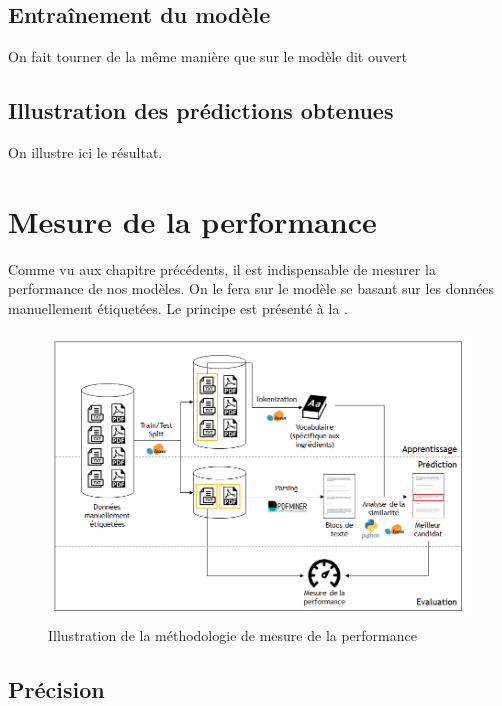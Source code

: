         \section{Entraînement du modèle}

        On fait tourner de la même manière que sur le modèle dit \og ouvert \fg

        \section{Illustration des prédictions obtenues}

        On illustre ici le résultat.

    \chapter{Mesure de la performance}
    
    Comme vu aux chapitre précédents, il est indispensable de mesurer la performance de nos modèles.
    On le fera sur le modèle se basant sur les données manuellement étiquetées.
    Le principe est présenté à la .

    \begin{figure}[htbp]
        \begin{center}
        \includegraphics[width=0.9\linewidth]{img/measured_model.png}
        \end{center}
        \caption{Illustration de la méthodologie de mesure de la performance}
        \label{fig:measured_model}
    \end{figure}     

        \section{Précision}
        
